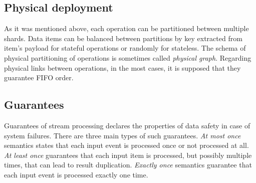 \subsection{Physical deployment}
As it was mentioned above, each operation can be partitioned between multiple shards. Data items can be balanced between partitions by key extracted from item's payload for stateful operations or randomly for stateless. The schema of physical partitioning of operations is sometimes called {\it physical graph}. Regarding physical links between operations, in the most cases, it is supposed that they guarantee FIFO order.

\subsection{Guarantees}
Guarantees of stream processing declares the properties of data safety in case of system failures. There are three main types of such guarantees. {\it At most once} semantics states that each input event is processed once or not processed at all. {\it At least once} guarantees that each input item is processed, but possibly multiple times, that can lead to result duplication. {\it Exactly once} semantics guarantee that each input event is processed exactly one time.  
